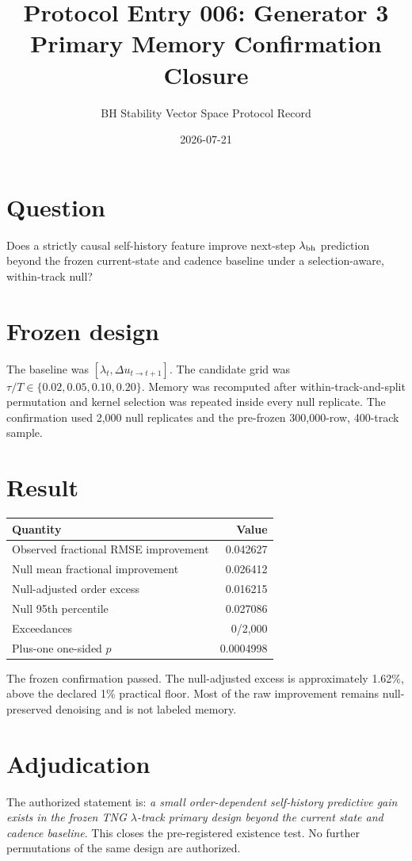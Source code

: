 \documentclass[11pt]{article}
\title{Protocol Entry 006: Generator 3 Primary Memory Confirmation Closure}
\author{BH Stability Vector Space Protocol Record}
\date{2026-07-21}
\begin{document}
\maketitle

\section*{Question}
Does a strictly causal self-history feature improve next-step $\lambda_{\rm bh}$
prediction beyond the frozen current-state and cadence baseline under a
selection-aware, within-track null?

\section*{Frozen design}
The baseline was $[\lambda_t,\Delta u_{t\rightarrow t+1}]$.  The candidate
grid was $\tau/T\in\{0.02,0.05,0.10,0.20\}$.  Memory was recomputed after
within-track-and-split permutation and kernel selection was repeated inside
every null replicate.  The confirmation used 2,000 null replicates and the
pre-frozen 300,000-row, 400-track sample.

\section*{Result}
\begin{center}
\begin{tabular}{lr}
\toprule
Quantity & Value \\
\midrule
Observed fractional RMSE improvement & 0.042627 \\
Null mean fractional improvement & 0.026412 \\
Null-adjusted order excess & 0.016215 \\
Null 95th percentile & 0.027086 \\
Exceedances & 0/2,000 \\
Plus-one one-sided $p$ & 0.0004998 \\
\bottomrule
\end{tabular}
\end{center}

The frozen confirmation passed.  The null-adjusted excess is approximately
1.62\%, above the declared 1\% practical floor.  Most of the raw improvement
remains null-preserved denoising and is not labeled memory.

\section*{Adjudication}
The authorized statement is: \emph{a small order-dependent self-history
predictive gain exists in the frozen TNG $\lambda$-track primary design beyond
the current state and cadence baseline}.  This closes the pre-registered
existence test.  No further permutations of the same design are authorized.
\end{document}
